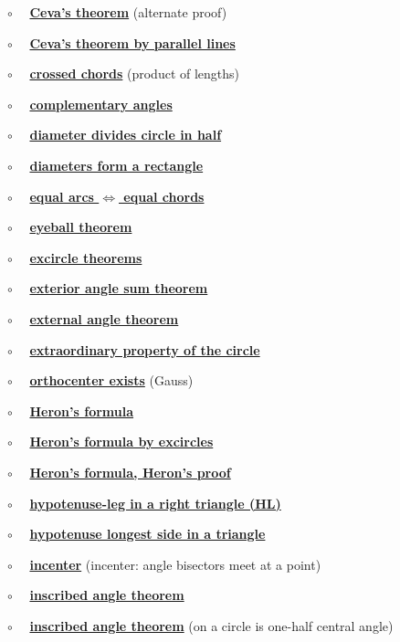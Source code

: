 \documentclass[11pt, oneside]{article}
\begin{document}
$\circ$ \ \ \hyperref[sec:ceva_alternate_proof]{\textbf{Ceva's theorem}} (alternate proof)

$\circ$ \ \ \hyperref[sec:ceva_parallel_lines]{\textbf{Ceva's theorem by parallel lines}}

$\circ$ \ \ \hyperref[sec:chord_segments]{\textbf{crossed chords}} (product of lengths)

$\circ$ \ \ \hyperref[sec:complementary_angle_theorem]{\textbf{complementary angles}}

$\circ$ \ \ \hyperref[sec:diameter_of_a_circle]{\textbf{diameter divides circle in half}}

$\circ$ \ \ \hyperref[sec:diameters_form_rectangle]{\textbf{diameters form a rectangle}}

$\circ$ \ \ \hyperref[sec:equal_arcs_equal_chords]{\textbf{equal arcs $\iff$ equal chords}}

$\circ$ \ \ \hyperref[sec:eyeball_theorem]{\textbf{eyeball theorem}}

$\circ$ \ \ \hyperref[sec:excircle_theorems]{\textbf{excircle theorems}}

$\circ$ \ \ \hyperref[sec:exterior_angle_sum_theorem]{\textbf{exterior angle sum theorem}}

$\circ$ \ \ \hyperref[sec:external_angle_theorem]{\textbf{external angle theorem}}

$\circ$ \ \ \hyperref[sec:extraordinary_property]{\textbf{extraordinary property of the circle}}

$\circ$ \ \ \hyperref[sec:Gauss_orthocenter]{\textbf{orthocenter exists}} (Gauss)

$\circ$ \ \ \hyperref[sec:Heron_formula]{\textbf{Heron's formula}}

$\circ$ \ \ \hyperref[sec:Heron_formula_excircles]{\textbf{Heron's formula by excircles}}

$\circ$ \ \ \hyperref[sec:Heron_formula_Heron]{\textbf{Heron's formula, Heron's proof}}

$\circ$ \ \ \hyperref[sec:SSA_in_right]{\textbf{hypotenuse-leg in a right triangle (HL)}}

$\circ$ \ \ \hyperref[sec:hypotenuse_longest]{\textbf{hypotenuse longest side in a triangle}}

$\circ$ \ \ \hyperref[sec:incenter]{\textbf{incenter}} (incenter:  angle bisectors meet at a point)

$\circ$ \ \ \hyperref[sec:equal_angles_same_arc]{\textbf{inscribed angle theorem}}

$\circ$ \ \ \hyperref[sec:peripheral_angle]{\textbf{inscribed angle theorem}} (on a circle is one-half central angle)
\end{document}
